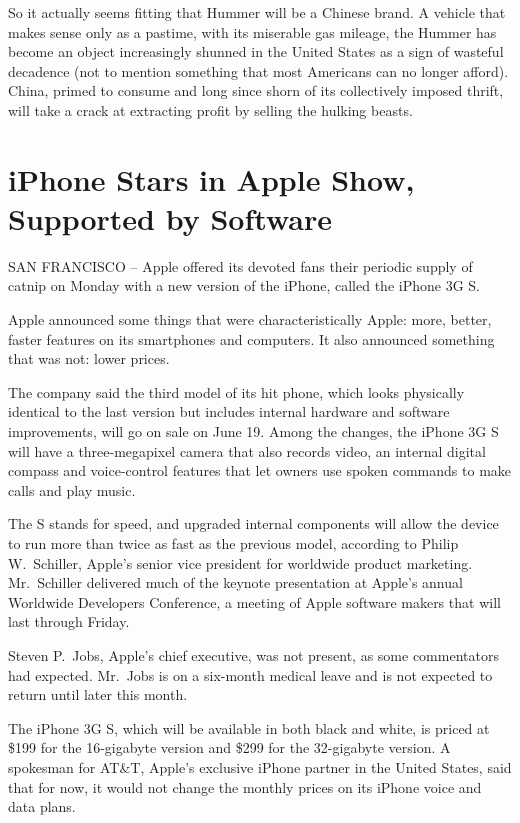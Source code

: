 \documentclass[12pt,a4paper,onecolumn]{article}
\begin{document}
So it actually seems fitting that Hummer will be a Chinese brand. A vehicle that makes sense only as a pastime, with its miserable gas mileage, the Hummer has become an object increasingly shunned in the United States as a sign of wasteful decadence (not to mention something that most Americans can no longer afford). China, primed to consume and long since shorn of its collectively imposed thrift, will take a crack at extracting profit by selling the hulking beasts.


\section{iPhone Stars in Apple Show, Supported by Software}

SAN FRANCISCO -- Apple offered its devoted fans their periodic supply of catnip on Monday with a new
version of the iPhone, called the iPhone 3G S.

Apple announced some things that were characteristically Apple: more, better, faster features on its
smartphones and computers. It also announced something that was not: lower prices.

The company said the third model of its hit phone, which looks physically identical to the last
version but includes internal hardware and software improvements, will go on sale on June 19. Among
the changes, the iPhone 3G S will have a three-megapixel camera that also records video, an internal
digital compass and voice-control features that let owners use spoken commands to make calls and
play music.

The S stands for speed, and upgraded internal components will allow the device to run more than
twice as fast as the previous model, according to Philip W.~Schiller, Apple's senior vice president
for worldwide product marketing. Mr.~Schiller delivered much of the keynote presentation at Apple's
annual Worldwide Developers Conference, a meeting of Apple software makers that will last through
Friday.

Steven P.~Jobs, Apple's chief executive, was not present, as some commentators had expected.
Mr.~Jobs is on a six-month medical leave and is not expected to return until later this month.

The iPhone 3G S, which will be available in both black and white, is priced at \$199 for the
16-gigabyte version and \$299 for the 32-gigabyte version. A spokesman for AT\&T, Apple's exclusive
iPhone partner in the United States, said that for now, it would not change the monthly prices on
its iPhone voice and data plans.
\end{document}
